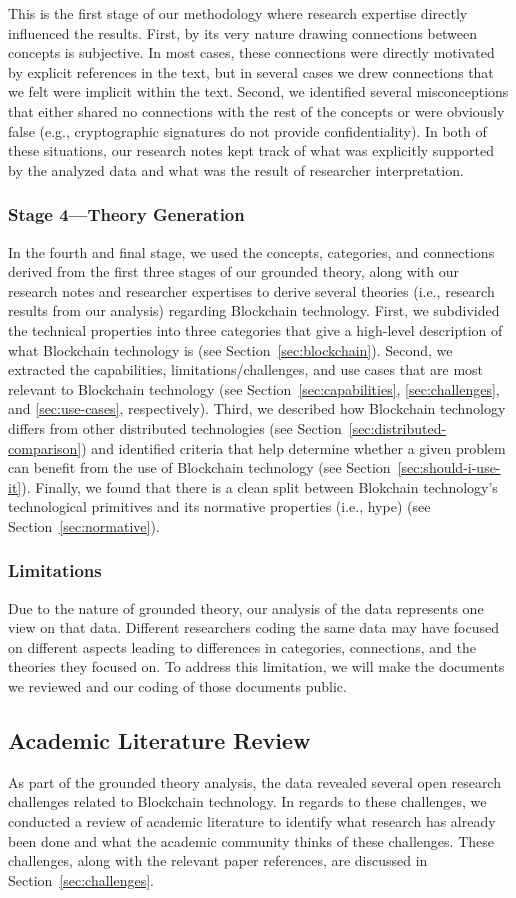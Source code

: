 This is the first stage of our methodology where research expertise directly influenced the results.
First, by its very nature drawing connections between concepts is subjective.
In most cases, these connections were directly motivated by explicit references in the text, but in several cases we drew connections that we felt were implicit within the text.
Second, we identified several misconceptions that either shared no connections with the rest of the concepts or were obviously false (e.g., cryptographic signatures do not provide confidentiality).
In both of these situations, our research notes kept track of what was explicitly supported by the analyzed data and what was the result of researcher interpretation.

\subsubsection{Stage 4---Theory Generation}
In the fourth and final stage, we used the concepts, categories, and connections derived from the first three stages of our grounded theory, along with our research notes and researcher expertises to derive several theories (i.e., research results from our analysis) regarding Blockchain technology.
First, we subdivided the technical properties into three categories that give a high-level description of what Blockchain technology is (see Section~\ref{sec:blockchain}).
Second, we extracted the capabilities, limitations/challenges, and use cases that are most relevant to Blockchain technology (see Section~\ref{sec:capabilities}, \ref{sec:challenges}, and \ref{sec:use-cases}, respectively).
Third, we described how Blockchain technology differs from other distributed technologies (see Section~\ref{sec:distributed-comparison}) and identified criteria that help determine whether a given problem can benefit from the use of Blockchain technology (see Section~\ref{sec:should-i-use-it}).
Finally, we found that there is a clean split between Blokchain technology's technological primitives and its normative properties (i.e., hype) (see Section~\ref{sec:normative}).

\subsubsection{Limitations}
Due to the nature of grounded theory, our analysis of the data represents one view on that data.
Different researchers coding the same data may have focused on different aspects leading to differences in categories, connections, and the theories they focused on.
To address this limitation, we will make the documents we reviewed and our coding of those documents public.

\subsection{Academic Literature Review}
As part of the grounded theory analysis, the data revealed several open research challenges related to Blockchain technology.
In regards to these challenges, we conducted a review of academic literature to identify what research has already been done and what the academic community thinks of these challenges.
These challenges, along with the relevant paper references, are discussed in Section~\ref{sec:challenges}.